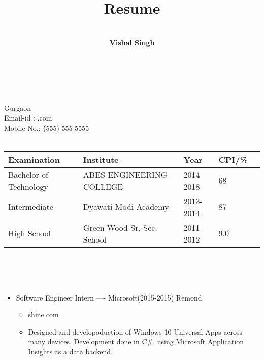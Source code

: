\documentclass[a4paper,10pt]{article}
\newcommand{\isep}{-2 pt}
\newcommand{\lsep}{-0.5cm}
\renewcommand{\maketitle}{
{\bfseries
\theauthor}
}
\begin{document}
\hspace{0.5cm}\\[-0.2cm]

\title{Resume}
\author{\bfseries\\Vishal Singh}
\maketitle \\
\indent Gurgaon \\
\indent Email-id : \textbfvishalsingh@ht.com \\
\indent Mobile No.: \textbf(555) 555-5555 \\





\\[\lsep]


\begin{table}[ht!]
\begin{left}
\indent \begin{tabular}{ l @{\hskip 0.15in} l @{\hskip 0.15in} l @{\hskip 0.15in} l @{\hskip 0.15in} l }
\hline
\textbf{Examination}  & \textbf{Institute} & \textbf{Year} & \textbf{CPI/\%} \\
\hline

Bachelor of Technology & ABES ENGINEERING COLLEGE & 2014-2018 & 68\\

Intermediate & Dyawati Modi Academy & 2013-2014 & 87\\

High School & Green Wood Sr. Sec. School & 2011-2012 & 9.0\\

\end{tabular}
\end{left}
\end{table}
\\ \\




\\[\lsep]

\begin{itemize}
\item 
 Software Engineer Intern ---- Microsoft(2015-2015)  Remond  \\[-0.6cm]

	\begin{itemize}\itemsep \isep 
	\item shine.com

	\item Designed and developoduction of Windows 10 Universal Apps across many devices. Development done in C#, using Microsoft Application Insights as a data backend. 

	\end{itemize}
\end{itemize}
\end{document}
